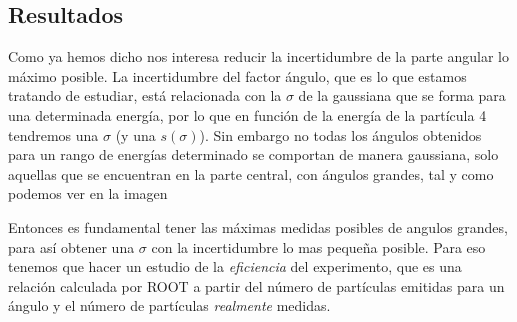 \documentclass[12pt,a4paper]{article}
\numberwithin{equation}{section}
\numberwithin{figure}{section}
\begin{document}
\subsection{Resultados}

Como ya hemos dicho nos interesa reducir la incertidumbre de la parte angular lo máximo posible. La incertidumbre del factor ángulo, que es lo que estamos tratando de estudiar, está relacionada con la $\sigma$ de la gaussiana que se forma para una determinada energía, por lo que en función de la energía de la partícula 4 tendremos una $\sigma$ (y una $s(\sigma)$). Sin embargo no todas los ángulos obtenidos para un rango de energías determinado se comportan de manera gaussiana, solo aquellas que se encuentran en la parte central, con ángulos grandes, tal y como podemos ver en la imagen \\

\begin{figure}[h!] \centering
\end{figure}


Entonces es fundamental tener las máximas medidas posibles de angulos grandes, para así obtener una $\sigma$ con la incertidumbre lo mas pequeña posible. Para eso tenemos que hacer un estudio de la {\it eficiencia} del experimento, que es una relación calculada por ROOT a partir del número de partículas emitidas para un ángulo y el número de partículas {\it realmente} medidas. \\
\end{document}

